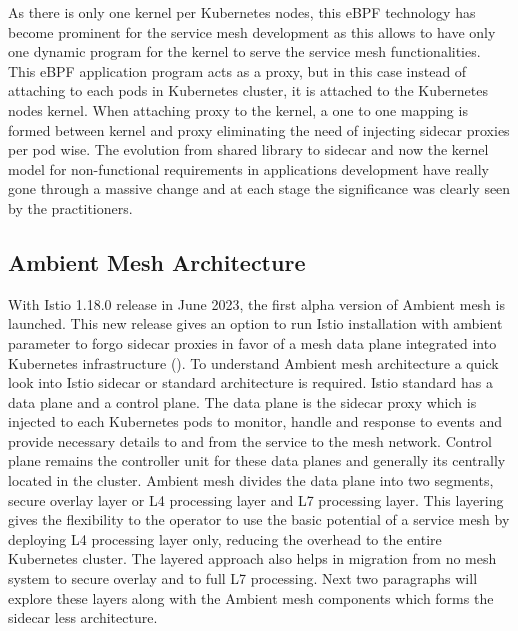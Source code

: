  As there is only one kernel per Kubernetes nodes, this eBPF technology has become prominent for the service mesh development as this allows to have only one dynamic program for the kernel to serve the service mesh functionalities. This eBPF application program acts as a proxy, but in this case instead of attaching to each pods in Kubernetes cluster, it is attached to the Kubernetes nodes kernel. When attaching proxy to the kernel, a one to one mapping is formed between kernel and proxy eliminating the need of injecting sidecar proxies per pod wise. The evolution from shared library to sidecar and now the kernel model for non-functional requirements in applications development have really gone through a massive change and at each stage the significance was clearly seen by the practitioners.

\subsection{Ambient Mesh Architecture}
With Istio 1.18.0 release in June 2023, the first alpha version of Ambient mesh is launched. This new release gives an option to run Istio installation with ambient parameter to forgo sidecar proxies in favor of a mesh data plane integrated into Kubernetes infrastructure (\cite{istioHoward2022}). To understand Ambient mesh architecture a quick look into Istio sidecar or standard architecture is required. Istio standard has a data plane and a control plane. The data plane is the sidecar proxy which is injected to each Kubernetes pods to monitor, handle and response to events and provide necessary details to and from the service to the mesh network. Control plane remains the controller unit for these data planes and generally its centrally located in the cluster. Ambient mesh divides the data plane into two segments, secure overlay layer or L4 processing layer and L7 processing layer. This layering gives the flexibility to the operator to use the basic potential of a service mesh by deploying L4 processing layer only, reducing the overhead to the entire Kubernetes cluster. The layered approach also helps in migration from no mesh system to secure overlay and to full L7 processing. Next two paragraphs will explore these layers along with the Ambient mesh components which forms the sidecar less architecture.

